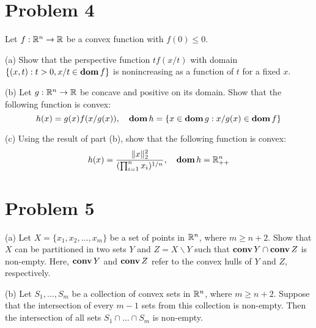 \documentclass[11pt]{article}
\begin{document}
\clearpage
\section*{Problem 4}
Let $f:{{\mathbb{R}}}^n\rightarrow {{\mathbb{R}}}$ be a convex function with $f(0)\leq 0$.

(a) Show that the perspective function $tf(x/t)$ with domain $\{(x, t): t>0, x/t\in\mathop{\textbf{dom}} f\}$ is nonincreasing as a function of $t$ for a fixed $x$.

(b) Let $g:{{\mathbb{R}}}^n\rightarrow {{\mathbb{R}}}$ be concave and positive on its domain. Show that the following function is convex:
\[
h(x) = g(x)f(x/g(x)), \quad \mathop{\textbf{dom}} h=\{x\in\mathop{\textbf{dom}} g: x/g(x) \in \mathop{\textbf{dom}} f\}
\]

(c) Using the result of part (b), show that the following function is convex:
\[
h(x) = \frac{\|x\|_2^2}{(\prod_{i=1}^{n}x_i)^{1/n}},\quad \mathop{\textbf{dom}} h = {{\mathbb{R}}}_{++}^n
\]

\clearpage
\section*{Problem 5}
(a) Let $X = \{x_1, x_2, \dots, x_m\}$ be a set of points in ${{\mathbb{R}}}^n$, where $m\geq n+2$. Show that $X$ can be partitioned in two sets $Y$ and $Z = X\backslash Y$ such that $\mathop {\textbf{conv}} Y \cap \mathop {\textbf{conv}} Z$ is non-empty. Here, $\mathop {\textbf{conv}} Y$ and $\mathop {\textbf{conv}} Z$ refer to the convex hulls of $Y$ and $Z$, respectively.

(b) Let $S_1, \dots, S_m$ be a collection of convex sets in ${{\mathbb{R}}}^n$, where $m\geq n + 2$. Suppose that the intersection of every $m-1$ sets from this collection is non-empty. Then the intersection of all sets $S_1\cap\dots\cap S_m$ is non-empty.
\end{document}
